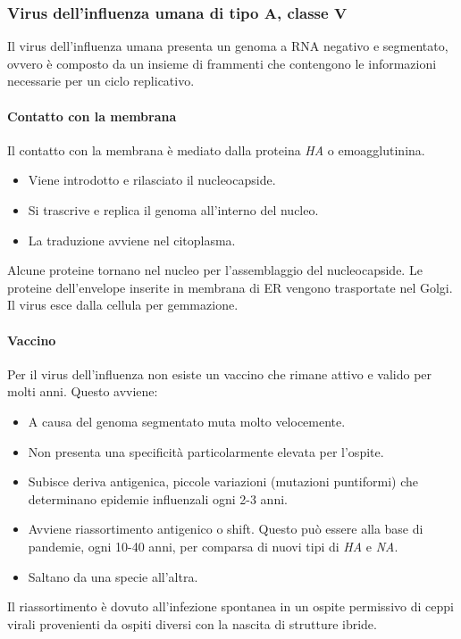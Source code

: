 		\subsubsection{Virus dell'influenza umana di tipo A, classe $\mathbf{V}$}
		Il virus dell'influenza umana presenta un genoma a RNA negativo e segmentato, ovvero \`e composto da un insieme di frammenti che contengono le informazioni necessarie per un ciclo replicativo.
		
			\paragraph{Contatto con la membrana}
			Il contatto con la membrana \`e mediato dalla proteina \emph{HA} o emoagglutinina.
			\begin{multicols}{2}
				\begin{itemize}
					\item Viene introdotto e rilasciato il nucleocapside.
					\item Si trascrive e replica il genoma all'interno del nucleo.
					\item La traduzione avviene nel citoplasma.
				\end{itemize}
			\end{multicols}
			Alcune proteine tornano nel nucleo per l'assemblaggio del nucleocapside.
			Le proteine dell'envelope inserite in membrana di ER vengono trasportate nel Golgi.
			Il virus esce dalla cellula per gemmazione.

			\paragraph{Vaccino}
			Per il virus dell'influenza non esiste un vaccino che rimane attivo e valido per molti anni. 
			Questo avviene:
			\begin{multicols}{2}
				\begin{itemize}
    					\item A causa del genoma segmentato muta molto velocemente.
    					\item Non presenta una specificit\`a particolarmente elevata per l'ospite.
    					\item Subisce deriva antigenica, piccole variazioni (mutazioni puntiformi) che determinano epidemie influenzali ogni 2-3 anni. 
    					\item Avviene riassortimento antigenico o shift. 
						Questo pu\`o essere alla base di pandemie, ogni 10-40 anni, per comparsa di nuovi tipi di \emph{HA} e \emph{NA}. 
					\item Saltano da una specie all'altra.
				\end{itemize}
			\end{multicols}
			Il riassortimento \`e dovuto all'infezione spontanea in un ospite permissivo di ceppi virali provenienti da ospiti diversi con la nascita di strutture ibride.

